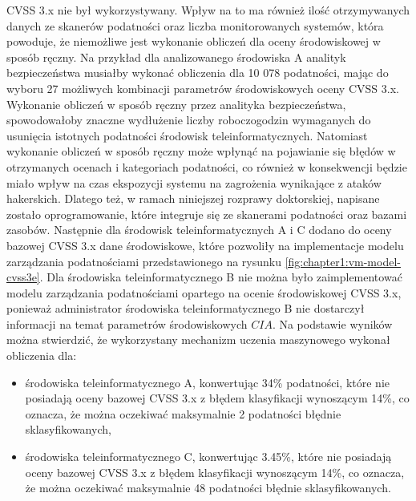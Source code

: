 CVSS 3.x nie był wykorzystywany. Wpływ na to ma również ilość otrzymywanych danych ze skanerów podatności oraz liczba monitorowanych systemów, która powoduje, że niemożliwe jest wykonanie obliczeń dla oceny środowiskowej w sposób ręczny. Na przykład dla analizowanego środowiska A analityk bezpieczeństwa musiałby wykonać obliczenia dla 10 078 podatności, mając do wyboru 27 możliwych kombinacji parametrów środowiskowych oceny CVSS 3.x. Wykonanie obliczeń w sposób ręczny przez analityka bezpieczeństwa, spowodowałoby znaczne wydłużenie liczby roboczogodzin wymaganych do usunięcia istotnych podatności środowisk teleinformatycznych. Natomiast wykonanie obliczeń w sposób ręczny może wpłynąć na pojawianie się błędów w otrzymanych ocenach i kategoriach podatności, co również w konsekwencji będzie miało wpływ na czas ekspozycji systemu na zagrożenia wynikające z ataków hakerskich. Dlatego też, w ramach niniejszej rozprawy doktorskiej, napisane zostało oprogramowanie, które integruje się ze skanerami podatności oraz bazami zasobów. Następnie dla środowisk teleinformatycznych A i C dodano do oceny bazowej CVSS 3.x dane środowiskowe, które pozwoliły na implementacje modelu zarządzania podatnościami przedstawionego na rysunku \ref{fig:chapter1:vm-model-cvss3e}. Dla środowiska teleinformatycznego B nie można było zaimplementować modelu zarządzania podatnościami opartego na ocenie środowiskowej CVSS 3.x, ponieważ administrator środowiska teleinformatycznego B nie dostarczył informacji na temat parametrów środowiskowych $CIA$. Na podstawie wyników można stwierdzić, że wykorzystany mechanizm uczenia maszynowego wykonał obliczenia dla: 
\begin{itemize}
    \item środowiska teleinformatycznego A, konwertując 34\% podatności, które nie posiadają oceny bazowej CVSS 3.x z błędem klasyfikacji wynoszącym 14\%, co oznacza, że można oczekiwać maksymalnie 2 podatności błędnie sklasyfikowanych,
    \item środowiska teleinformatycznego C, konwertując 3.45\%, które nie posiadają oceny bazowej CVSS 3.x z błędem klasyfikacji wynoszącym 14\%, co oznacza, że można oczekiwać maksymalnie 48 podatności błędnie sklasyfikowanych.
\end{itemize}
